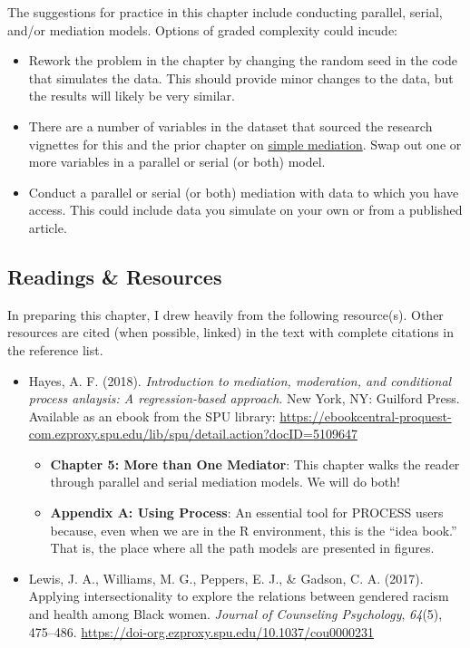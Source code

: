 \documentclass[
  11pt,
]{book}
\providecommand{\tightlist}{%
  \setlength{\itemsep}{0pt}\setlength{\parskip}{0pt}}
\begin{document}
The suggestions for practice in this chapter include conducting parallel, serial, and/or mediation models. Options of graded complexity could incude:

\begin{itemize}
\tightlist
\item
  Rework the problem in the chapter by changing the random seed in the code that simulates the data. This should provide minor changes to the data, but the results will likely be very similar.
\item
  There are a number of variables in the dataset that sourced the research vignettes for this and the prior chapter on \protect\hyperlink{SimpleMed}{simple mediation}. Swap out one or more variables in a parallel or serial (or both) model.
\item
  Conduct a parallel or serial (or both) mediation with data to which you have access. This could include data you simulate on your own or from a published article.
\end{itemize}

\hypertarget{readings-resources-5}{%
\subsection{Readings \& Resources}\label{readings-resources-5}}

In preparing this chapter, I drew heavily from the following resource(s). Other resources are cited (when possible, linked) in the text with complete citations in the reference list.

\begin{itemize}
\tightlist
\item
  Hayes, A. F. (2018). \emph{Introduction to mediation, moderation, and conditional process anlaysis: A regression-based approach}. New York, NY: Guilford Press. Available as an ebook from the SPU library: \url{https://ebookcentral-proquest-com.ezproxy.spu.edu/lib/spu/detail.action?docID=5109647}

  \begin{itemize}
  \tightlist
  \item
    \textbf{Chapter 5: More than One Mediator}: This chapter walks the reader through parallel and serial mediation models. We will do both!
  \item
    \textbf{Appendix A: Using Process}: An essential tool for PROCESS users because, even when we are in the R environment, this is the ``idea book.'' That is, the place where all the path models are presented in figures.
  \end{itemize}
\item
  Lewis, J. A., Williams, M. G., Peppers, E. J., \& Gadson, C. A. (2017). Applying intersectionality to explore the relations between gendered racism and health among Black women. \emph{Journal of Counseling Psychology}, \emph{64}(5), 475--486. \url{https://doi-org.ezproxy.spu.edu/10.1037/cou0000231}
\end{itemize}
\end{document}
